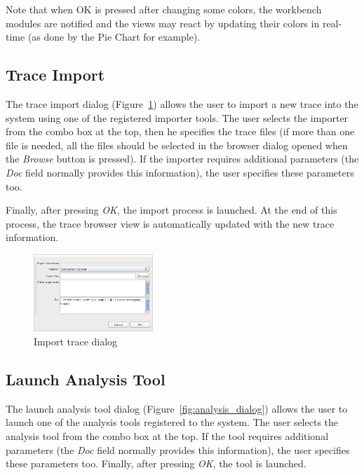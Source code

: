\documentclass[twoside]{article}
\begin{document}
\begin{sloppypar}
Note that when OK is pressed after changing some colors, the workbench modules are notified and the views may react by updating their colors in real-time (as done by the Pie Chart for example).

\subsection{Trace Import}
\label{subsec:import}

The trace import dialog (Figure~\ref{fig:import_dialog}) allows the user to import a new trace into the system using one of the registered importer tools.
The user selects the importer from the combo box at the top, then he specifies the trace files (if more than one file is needed, all the files should be selected in the browser dialog opened when the \emph{Browse} button is pressed). 
If the importer requires additional parameters (the \emph{Doc} field normally provides this information), the user specifies these parameters too.

Finally, after pressing \emph{OK}, the import process is launched.
At the end of this process, the trace browser view is automatically updated with the new trace information.

\begin{figure}[h!]
  \centering
    \includegraphics[width=0.4\textwidth]{images/import_dialog.png}
  \caption{Import trace dialog}
  \label{fig:import_dialog}
\end{figure}

\subsection{Launch Analysis Tool}
\label{subsec:analysis}

The launch analysis tool dialog (Figure~\ref{fig:analysis_dialog}) allows the user to launch one of the analysis tools registered to the system.
The user selects the analysis tool from the combo box at the top. 
If the tool requires additional parameters (the \emph{Doc} field normally provides this information), the user specifies these parameters too. 
Finally, after pressing \emph{OK}, the tool is launched. 


\end{sloppypar}
\end{document}
